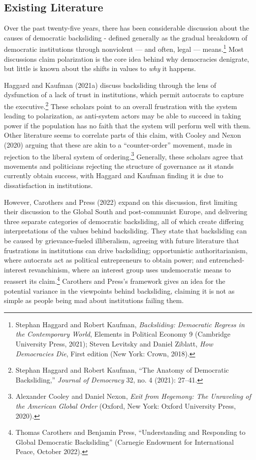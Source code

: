 \documentclass[
  letterpaper,
  DIV=11,
  numbers=noendperiod]{scrartcl}
\begin{document}
\subsection{Existing Literature}\label{existing-literature}

Over the past twenty-five years, there has been considerable discussion
about the causes of democratic backsliding - defined generally as the
gradual breakdown of democratic institutions through nonviolent --- and
often, legal --- means.\footnote{Stephan Haggard and Robert Kaufman,
  \emph{Backsliding: {Democratic Regress} in the {Contemporary World}},
  Elements in {Political Economy} 9 (Cambridge University Press, 2021);
  Steven Levitsky and Daniel Ziblatt, \emph{How {Democracies Die}},
  First edition (New York: Crown, 2018).} Most discussions claim
polarization is the core idea behind why democracies denigrate, but
little is known about the shifts in values to \emph{why} it happens.

Haggard and Kaufman (2021a) discuss backsliding through the lens of
dysfunction of a lack of trust in institutions, which permit autocrats
to capture the executive.\footnote{Stephan Haggard and Robert Kaufman,
  {``The {Anatomy} of {Democratic Backsliding},''} \emph{Journal of
  Democracy} 32, no. 4 (2021): 27--41.} These scholars point to an
overall frustration with the system leading to polarization, as
anti-system actors may be able to succeed in taking power if the
population has no faith that the system will perform well with them.
Other literature seems to correlate parts of this claim, with Cooley and
Nexon (2020) arguing that these are akin to a ``counter-order''
movement, made in rejection to the liberal system of
ordering.\footnote{Alexander Cooley and Daniel Nexon, \emph{Exit from
  {Hegemony}: {The Unraveling} of the {American Global Order}} (Oxford,
  New York: Oxford University Press, 2020).} Generally, these scholars
agree that movements and politicians rejecting the structure of
governance as it stands currently obtain success, with Haggard and
Kaufman finding it is due to dissatisfaction in institutions.

However, Carothers and Press (2022) expand on this discussion, first
limiting their discussion to the Global South and post-communist Europe,
and delivering three separate categories of democratic backsliding, all
of which create differing interpretations of the values behind
backsliding. They state that backsliding can be caused by
grievance-fueled illiberalism, agreeing with future literature that
frustrations in institutions can drive backsliding; opportunistic
authoritarianism, where autocrats act as political entrepreneurs to
obtain power; and entrenched-interest revanchinism, where an interest
group uses undemocratic means to reassert its claim.\footnote{Thomas
  Carothers and Benjamin Press, {``Understanding and {Responding} to
  {Global Democratic Backsliding}''} (Carnegie Endowment for
  International Peace, October 2022).} Carothers and Press's framework
gives an idea for the potential variance in the viewpoints behind
backsliding, claiming it is not as simple as people being mad about
institutions failing them.
\end{document}
